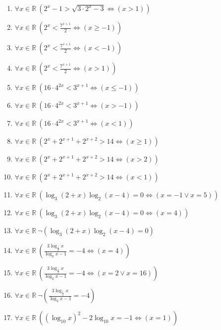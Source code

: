 \documentclass[11pt,a4paper]{article}
\begin{document}
\begin{enumerate}
\item $\displaystyle \forall x \in \mathbb{R}\ \left( 2^{x} - 1 > \sqrt{3 \cdot 2^{x} - 3} \iff \left( x > 1 \right) \right)$
\item $\displaystyle \forall x \in \mathbb{R}\ \left( 2^{x} < \frac{7^{x+1}}{2} \iff \left( x \ge -1 \right) \right)$
\item $\displaystyle \forall x \in \mathbb{R}\ \left( 2^{x} < \frac{7^{x+1}}{2} \iff \left( x < -1 \right) \right)$
\item $\displaystyle \forall x \in \mathbb{R}\ \left( 2^{x} < \frac{7^{x+1}}{2} \iff \left( x > 1 \right) \right)$
\item $\displaystyle \forall x \in \mathbb{R}\ \left( 16 \cdot 4^{2x} < 3^{x+1} \iff \left( x \le -1 \right) \right)$
\item $\displaystyle \forall x \in \mathbb{R}\ \left( 16 \cdot 4^{2x} < 3^{x+1} \iff \left( x > -1 \right) \right)$
\item $\displaystyle \forall x \in \mathbb{R}\ \left( 16 \cdot 4^{2x} < 3^{x+1} \iff \left( x < 1 \right) \right)$
\item $\displaystyle \forall x \in \mathbb{R}\ \left( 2^{x} + 2^{x+1} + 2^{x+2} > 14 \iff \left( x \ge 1 \right) \right)$
\item $\displaystyle \forall x \in \mathbb{R}\ \left( 2^{x} + 2^{x+1} + 2^{x+2} > 14 \iff \left( x > 2 \right) \right)$
\item $\displaystyle \forall x \in \mathbb{R}\ \left( 2^{x} + 2^{x+1} + 2^{x+2} > 14 \iff \left( x < 1 \right) \right)$
\item $\displaystyle \forall x \in \mathbb{R}\ \left( \log_{3}(2 + x)\log_{2}(x - 4) = 0 \iff \left( x = -1 \lor x = 5 \right) \right)$
\item $\displaystyle \forall x \in \mathbb{R}\ \left( \log_{3}(2 + x)\log_{2}(x - 4) = 0 \iff \left( x = 4 \right) \right)$
\item $\displaystyle \forall x \in \mathbb{R}\ \lnot \left( \log_{3}(2 + x)\log_{2}(x - 4) = 0 \right)$
\item $\displaystyle \forall x \in \mathbb{R}\ \left( \frac{3\log_{\frac{1}{2}} x}{\log_{2} x - 1} = -4 \iff \left( x = 4 \right) \right)$
\item $\displaystyle \forall x \in \mathbb{R}\ \left( \frac{3\log_{\frac{1}{2}} x}{\log_{2} x - 1} = -4 \iff \left( x = 2 \lor x = 16 \right) \right)$
\item $\displaystyle \forall x \in \mathbb{R}\ \lnot \left( \frac{3\log_{\frac{1}{2}} x}{\log_{2} x - 1} = -4 \right)$
\item $\displaystyle \forall x \in \mathbb{R}\ \left( \left(\log_{10} x\right)^{2} - 2\log_{10} x = -1 \iff \left( x = 1 \right) \right)$

\end{enumerate}
\end{document}
